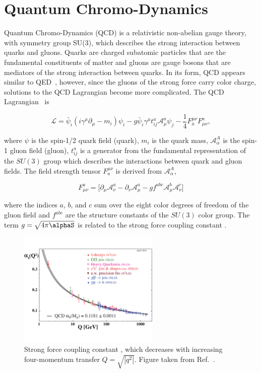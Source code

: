 
\section{Quantum Chromo-Dynamics}

Quantum Chromo-Dynamics (QCD) is a relativistic non-abelian gauge theory, with symmetry group SU(3), which describes the strong interaction between quarks and gluons. Quarks are charged subatomic particles that are the fundamental constituents of matter and gluons are gauge bosons that are mediators of the strong interaction between quarks. In its form, QCD appears similar to QED~\cite{Seymour:2005hs}, however, since the gluons of the strong force carry color charge, solutions to the QCD Lagrangian become more complicated. The QCD Lagrangian~\cite{qcdbook} is 

\begin{equation}
\mathcal{L}=\bar{\psi}_{i}(i\gamma^{\mu}\partial_{\mu}-m_{i})\psi_{i}-g\bar{\psi}_{i}\gamma^{\mu}t_{ij}^{a}\mathcal{A}_{\mu}^{a}\psi_{j}-\frac{1}{4}F^{\mu\nu}_{a}F_{\mu\nu}^{a},
\label{eq:lagrangian}
\end{equation}

where $\psi$ is the spin-1/2 quark field (quark), $m_{i}$ is the quark mass,  $\mathcal{A}_{\alpha}^{A}$ is the spin-1 gluon field (gluon), $t_{ij}^{a}$ is a generator from the fundamental representation of the $SU(3)$ group which describes the interactions between quark and gluon fields. The field strength tensor $F^{\mu\nu}_{a}$ is derived from $\mathcal{A}_{\alpha}^{A}$,

\begin{equation}
F_{\mu\nu}^{a}=\Big[ \partial_{\mu}\mathcal{A}_{\nu}^{a} - \partial_{\nu}\mathcal{A}_{\mu}^{a} - g f^{abc}\mathcal{A}_{\mu}^{b}\mathcal{A}_{\nu}^{c}\Big]
\label{eq:fieldtensor}
\end{equation}

where the indices $a$, $b$, and $c$ sum over the eight color degrees of freedom of the gluon field and $f^{abc}$ are the structure constants of the $SU(3)$ color group. The term $g=\sqrt{4 \pi \alphaS }$ is related to the strong force coupling constant \alphaS.

\begin{figure}
	\centerline{
		\includegraphics[width=0.6\textwidth]{figures/asq-2015.pdf} 
	}
	\caption{Strong force coupling constant \alphaqs, which decreases with increasing four-momentum transfer $Q=\sqrt{|q^{2}|}$.  Figure taken from Ref.~\cite{pdg:2018}.}
	\label{fig:strongforceconstant}
\end{figure}

